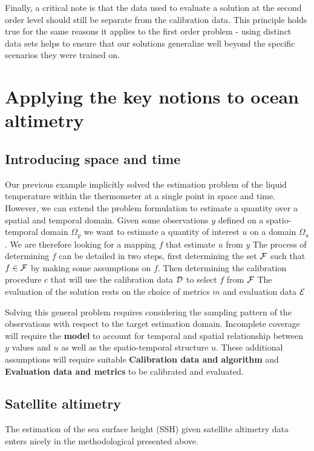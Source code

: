 \begin{bibunit}
Finally, a critical note is that the data used to evaluate a solution at the second order level should still be separate from the calibration data. This principle holds true for the same reasons it applies to the first order problem - using distinct data sets helps to ensure that our solutions generalize well beyond the specific scenarios they were trained on.

\section{Applying the key notions to ocean altimetry}
\subsection*{Introducing space and time}
Our previous example implicitly solved the estimation problem of the liquid temperature within the thermometer at a single point in space and time.
However, we can extend the problem formulation to estimate a quantity over a spatial and temporal domain.
Given some observations $y$ defined on a spatio-temporal domain $\Omega_y$ we want to estimate a quantity of interest $u$ on a domain $\Omega_u$. We are therefore looking for a mapping $f$ that estimate $u$ from $y$
The process of determining $f$ can be detailed in two steps, first determining the set $\cal{F}$ such that $f \in \cal{F}$ by making some assumptions on $f$. Then determining the calibration procedure $c$ that will use the calibration data $\cal{D}$ to select $f$ from $\cal{F}$
The evaluation of the solution rests on the choice of metrics $m$ and evaluation data $\cal{E}$

Solving this general problem requires considering the sampling pattern of the observations with respect to the target estimation domain.
Incomplete coverage will require the \textbf{model} to account for temporal and spatial relationship between $y$ values and $u$ as well as the spatio-temporal structure $u$.
These additional assumptions will require suitable \textbf{Calibration data and algorithm} and \textbf{Evaluation data and metrics} to be calibrated and evaluated.



\subsection*{Satellite altimetry}


The estimation of the sea surface height (SSH) given satellite altimetry data enters nicely in the methodological presented above.


\end{bibunit}
